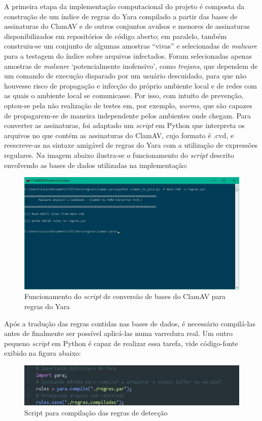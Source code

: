 A primeira etapa da implementação computacional do projeto é composta da
construção de um índice de regras do Yara compilado a partir das bases de
assinaturas do ClamAV e de outros conjuntos avulsos e menores de assinaturas
disponibilizados em repositórios de código aberto; em paralelo, também
construiu-se um conjunto de algumas amostras ``vivas'' e selecionadas de
\textit{malware} para a testagem do índice sobre arquivos infectados. Foram
selecionadas apenas amostras de \textit{malware} `potencialmente inofensivo',
como \textit{trojans}, que dependem de um comando de execução disparado por um
usuário descuidado, para que não houvesse risco de propagação e infecção do
próprio ambiente local e de redes com as quais o ambiente local se comunicasse.
Por isso, com intuito de prevenção, optou-se pela não realização de testes em,
por exemplo, \textit{worms}, que são capazes de propagarem-se de maneira
independente pelos ambientes onde chegam. Para converter as assinaturas, foi
adaptado um \textit{script} em Python que interpreta os arquivos no que contém
as assinaturas do ClamAV, cujo formato é .cvd, e reescreve-as na sintaxe
amigável de regras do Yara com a utilização de expressões regulares. Na imagem
abaixo ilustra-se o funcionamento do \textit{script} descrito envolvendo as
bases de dados utilizadas na implementação:
\begin{figure}[H]
  \includegraphics[scale=0.6]{figs/regras_convertidas}
  \centering
  \caption{Funcionamento do \textit{script} de conversão de bases do ClamAV para regras do Yara}
  \label{f.regras_convertidas}
\end{figure}

Após a tradução das regras contidas nas bases de dados, é necessário compilá-las
antes de finalmente ser possível aplicá-las numa varredura real. Um outro
pequeno \textit{script} em Python é capaz de realizar essa tarefa, vide
código-fonte exibido na figura abaixo:
\begin{figure}[H]
  \includegraphics[scale=0.6]{figs/script_conversao}
  \centering
  \caption{Script para compilação das regras de detecção}
  \label{f.script_comp}
\end{figure}

